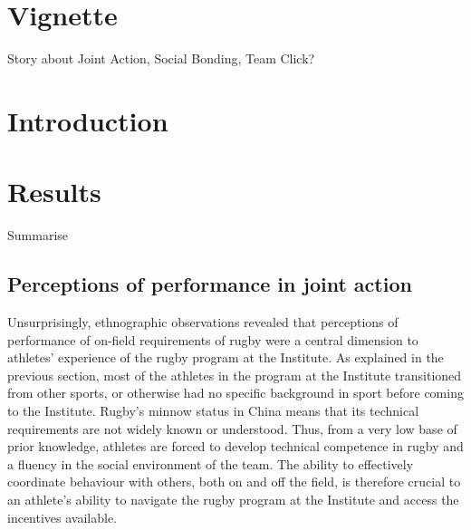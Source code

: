                                       \begin{CJK}{UTF8}{gbsn}


\section{Vignette}

Story about Joint Action, Social Bonding, Team Click?



\section{Introduction}








\section{Results}

Summarise

\subsection{Perceptions of performance in joint action}

Unsurprisingly, ethnographic observations revealed that perceptions of performance of on-field requirements of rugby were a central dimension to athletes' experience of the rugby program at the Institute.  As explained in the previous section, most of the athletes in the program at the Institute transitioned from other sports, or otherwise had no specific background in sport before coming to the Institute.  Rugby's minnow status in China means that its technical requirements are not widely known or understood.  Thus, from a very low base of prior knowledge, athletes are forced to develop technical competence in rugby and a fluency in the social environment of the team.  The ability to effectively coordinate behaviour with others, both on and off the field, is therefore crucial to an athlete's ability to navigate the rugby program at the Institute and access the incentives available.



\end{CJK}
